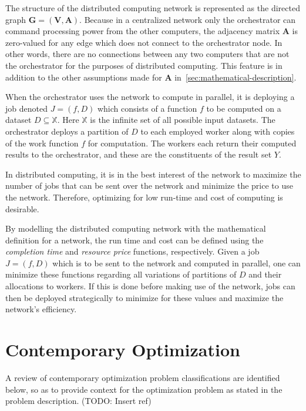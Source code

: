 \documentclass[../mthe-493-final-project.tex]{subfiles}
\begin{document}
    The structure of the distributed computing network is represented as the directed graph $\mathbf{G} = (\mathbf{V}, \mathbf{A})$. Because in a centralized network only the orchestrator can command processing power from the other computers, the adjacency matrix $\mathbf{A}$ is zero-valued for any edge which does not connect to the orchestrator node. In other words, there are no connections between any two computers that are not the orchestrator for the purposes of distributed computing. This feature is in addition to the other assumptions made for $\mathbf{A}$ in~\autoref{sec:mathematical-description}.

    When the orchestrator uses the network to compute in parallel, it is deploying a job denoted $J = (f,D)$ which consists of a function $f$ to be computed on a dataset $D \subseteq \mathbb{X}$. Here $\mathbb{X}$ is the infinite set of all possible input datasets. The orchestrator deploys a partition of $D$ to each employed worker along with copies of the work function $f$ for computation. The workers each return their computed results to the orchestrator, and these are the constituents of the result set $Y$.

    In distributed computing, it is in the best interest of the network to maximize the number of jobs that can be sent over the network and minimize the price to use the network. Therefore, optimizing for low run-time and cost of computing is desirable.

    By modelling the distributed computing network with the mathematical definition for a network, the run time and cost can be defined using the \textit{completion time} and \textit{resource price} functions, respectively. Given a job $J = (f,D)$ which is to be sent to the network and computed in parallel, one can minimize these functions regarding all variations of partitions of $D$ and their allocations to workers. If this is done before making use of the network, jobs can then be deployed strategically to minimize for these values and maximize the network's efficiency.
    
    
    
    \section{Contemporary Optimization}
    \label{sec:contemporary-optimization}

    A review of contemporary optimization problem classifications are identified below, so as to provide context for the optimization problem as stated in the problem description. (TODO: Insert ref)
\end{document}
